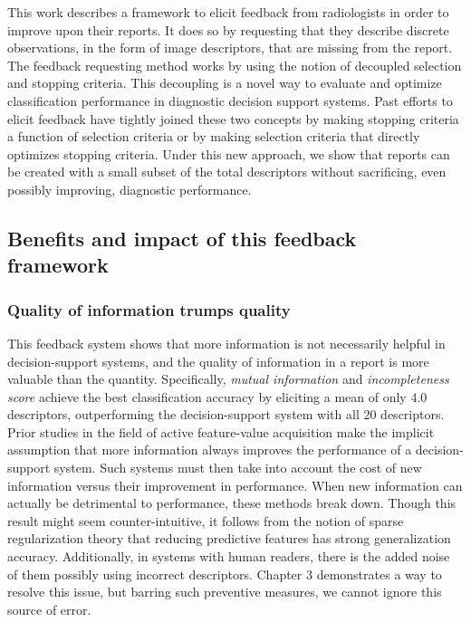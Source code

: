 This work describes a framework to elicit feedback from radiologists in order to improve upon their reports.
It does so by requesting that they describe discrete observations, in the form of image descriptors, that are missing from the report.
The feedback requesting method works by using the notion of decoupled selection and stopping criteria.
This decoupling is a novel way to evaluate and optimize classification performance in diagnostic decision support systems.
Past efforts to elicit feedback have tightly joined these two concepts by making stopping criteria a function of selection criteria or by making selection criteria that directly optimizes stopping criteria.
Under this new approach, we show that reports can be created with a small subset of the total descriptors without sacrificing, even possibly improving, diagnostic performance.

\subsection{Benefits and impact of this feedback framework}

\subsubsection{Quality of information trumps quality}
This feedback system shows that more information is not necessarily helpful in decision-support systems, and the quality of information in a report is more valuable than the quantity.
Specifically, \emph{mutual information} and \emph{incompleteness score} achieve the best classification accuracy by eliciting a mean of only 4.0 descriptors, outperforming the decision-support system with all 20 descriptors.
Prior studies in the field of active feature-value acquisition make the implicit assumption that more information always improves the performance of a decision-support system.
Such systems must then take into account the cost of new information versus their improvement in performance.
When new information can actually be detrimental to performance, these methods break down.
Though this result might seem counter-intuitive, it follows from the notion of sparse regularization theory that reducing predictive features has strong generalization accuracy.
Additionally, in systems with human readers, there is the added noise of them possibly using incorrect descriptors.
Chapter 3 demonstrates a way to resolve this issue, but barring such preventive measures, we cannot ignore this source of error.


